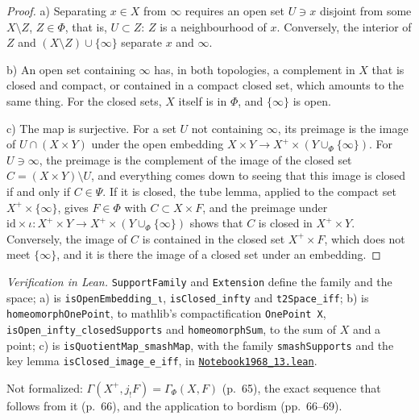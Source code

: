 \begin{proof}
a) Separating $x \in X$ from $\infty$ requires an open set $U \ni x$ disjoint from some $X \setminus Z$, $Z \in \Phi$, that is, $U \subset Z$: $Z$ is a neighbourhood of $x$. Conversely, the interior of $Z$ and $(X \setminus Z) \cup \{\infty\}$ separate $x$ and $\infty$.

b) An open set containing $\infty$ has, in both topologies, a complement in $X$ that is closed and compact, or contained in a compact closed set, which amounts to the same thing. For the closed sets, $X$ itself is in $\Phi$, and $\{\infty\}$ is open.

c) The map is surjective. For a set $U$ not containing $\infty$, its preimage is the image of $U \cap (X \times Y)$ under the open embedding $X \times Y \to X^+ \times (Y \cup_\Phi \{\infty\})$. For $U \ni \infty$, the preimage is the complement of the image of the closed set $C = (X \times Y) \setminus U$, and everything comes down to seeing that this image is closed if and only if $C \in \Psi$. If it is closed, the tube lemma, applied to the compact set $X^+ \times \{\infty\}$, gives $F \in \Phi$ with $C \subset X \times F$, and the preimage under $\mathrm{id} \times \iota : X^+ \times Y \to X^+ \times (Y \cup_\Phi \{\infty\})$ shows that $C$ is closed in $X^+ \times Y$. Conversely, the image of $C$ is contained in the closed set $X^+ \times F$, which does not meet $\{\infty\}$, and it is there the image of a closed set under an embedding.
\end{proof}

\begin{sloppypar}
\noindent\emph{Verification in Lean.} \texttt{SupportFamily} and \texttt{Extension} define the family and the space; a) is \texttt{isOpenEmbedding\_ι}, \texttt{isClosed\_infty} and \texttt{t2Space\_iff}; b) is \texttt{homeomorphOnePoint}, to mathlib's compactification \texttt{OnePoint X}, \texttt{isOpen\_infty\_closedSupports} and \texttt{homeomorphSum}, to the sum of $X$ and a point; c) is \texttt{isQuotientMap\_smashMap}, with the family \texttt{smashSupports} and the key lemma \texttt{isClosed\_image\_e\_iff}, in \href{\leanblobmain/Notebook1968_13.lean}{\texttt{Notebook1968\_13.\allowbreak{}lean}}.
\end{sloppypar}

Not formalized: $\Gamma(X^+, j_!F) = \Gamma_\Phi(X, F)$ (p.~65), the exact sequence that follows from it (p.~66), and the application to bordism (pp.~66--69).

